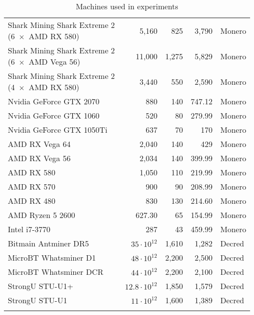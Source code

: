 \begin{longtable}{|p{}|r|r|r|p{}|}
  Shark Mining Shark Extreme 2 (6~$\times$~AMD RX 580) & 5,160 & 825 & 3,790 & Monero \\
  Shark Mining Shark Extreme 2 (6~$\times$~AMD Vega 56) & 11,000 & 1,275 & 5,829 & Monero \\
  Shark Mining Shark Extreme 2 (4~$\times$~AMD RX 580) & 3,440 & 550 & 2,590 & Monero \\
  Nvidia GeForce GTX 2070 & 880 & 140 & 747.12 & Monero \\
  Nvidia GeForce GTX 1060 & 520 & 80 & 279.99 & Monero \\
  Nvidia GeForce GTX 1050Ti & 637 & 70 & 170 & Monero \\
  AMD RX Vega 64 & 2,040 & 140 & 429 & Monero \\
  AMD RX Vega 56 & 2,034 & 140 & 399.99 & Monero \\
  AMD RX 580 & 1,050 & 110 & 219.99 & Monero \\
  AMD RX 570 & 900 & 90 & 208.99 & Monero \\
  AMD RX 480 & 830 & 130 & 214.60 & Monero \\
  AMD Ryzen 5 2600 & 627.30 & 65 & 154.99 & Monero \\
  Intel i7-3770 & 287 & 43 & 459.99 & Monero \\
  \hline
  Bitmain Antminer DR5 &   $35 \cdot 10^{12}$ & 1,610 & 1,282 & Decred \\
  MicroBT Whatsminer D1 &  $48 \cdot 10^{12}$ & 2,200 & 2,500 & Decred \\
  MicroBT Whatsminer DCR & $44 \cdot 10^{12}$ & 2,200 & 2,100 & Decred \\
  StrongU STU-U1+ &        $12.8 \cdot 10^{12}$ & 1,850 & 1,579 & Decred \\
  StrongU STU-U1 &         $11 \cdot 10^{12}$ & 1,600 & 1,389 & Decred \\
  \hline
\caption{Machines used in experiments}
\label{tbl:machines}
\end{longtable}
